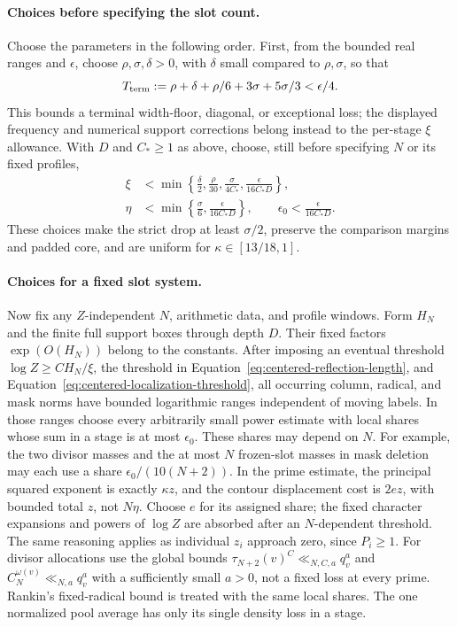 \documentclass[12pt]{article}
\begin{document}
\paragraph{Choices before specifying the slot count.}
Choose the parameters in the following order.  First, from the bounded
real ranges and \(\epsilon\), choose \(\rho,\sigma,\delta>0\), with
\(\delta\) small compared to \(\rho,\sigma\), so that
\[
 T_{\rm term}:=\rho+\delta+\rho/6+3\sigma+5\sigma/3<\epsilon/4.
\]
This bounds a terminal width-floor, diagonal, or exceptional loss;
the displayed frequency and numerical support corrections belong instead to the per-stage
\(\xi\) allowance.  With \(D\) and \(C_*\ge1\) as above, choose,
still before specifying \(N\) or its fixed profiles,
\begin{equation}
 \begin{aligned}
 \xi&<\min\left\{\frac\delta2,\frac\rho{30},
                  \frac{\sigma}{4C_*},
                  \frac{\epsilon}{16C_*D}\right\},\\
 \eta&<\min\left\{\frac\sigma6,
                   \frac{\epsilon}{16C_*D}\right\},\qquad
 \epsilon_0<\frac{\epsilon}{16C_*D}.
 \end{aligned}
 \label{old-eq:2.1i}
\end{equation}
These choices make the strict drop at least \(\sigma/2\), preserve
the comparison margins and padded core, and are uniform for
\(\kappa\in[13/18,1]\).

\paragraph{Choices for a fixed slot system.}
Now fix any \(Z\)-independent \(N\), arithmetic data, and profile
windows.  Form \(H_N\) and the finite full support boxes through
depth \(D\).  Their fixed factors \(\exp(O(H_N))\) belong to the
constants.  After imposing an eventual threshold
\(\log Z\ge C H_N/\xi\), the threshold in
Equation~\eqref{eq:centered-reflection-length}, and
Equation~\eqref{eq:centered-localization-threshold}, all occurring
column, radical, and mask norms have bounded logarithmic ranges
independent of moving labels.  In those ranges choose every
arbitrarily small power estimate with local shares whose sum in a
stage is at most \(\epsilon_0\).  These shares may depend on \(N\).
For example, the two divisor masses and the at most \(N\) frozen-slot
masses in mask deletion may each use a share
\(\epsilon_0/(10(N+2))\).  In the prime estimate, the principal
squared exponent is exactly \(\kappa z\), and the contour displacement
cost is \(2e z\), with bounded total \(z\), not \(N\eta\).  Choose
\(e\) for its assigned share; the fixed character expansions and
powers of \(\log Z\) are absorbed after an \(N\)-dependent threshold.
The same reasoning applies as individual \(z_i\) approach zero,
since \(P_i\ge1\).  For divisor allocations use the global bounds
\(\tau_{N+2}(v)^C\ll_{N,C,a}q_v^a\) and
\(C_N^{\omega(v)}\ll_{N,a}q_v^a\) with a sufficiently small
\(a>0\), not a fixed loss at every prime.  Rankin's fixed-radical
bound is treated with the same local shares.  The one normalized pool
average has only its single density loss in a stage.
\end{document}
